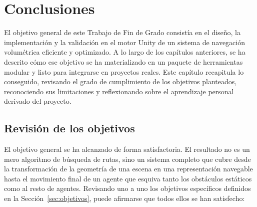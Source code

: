 \chapter{Conclusiones}
\label{chap:conclusiones}

El objetivo general de este Trabajo de Fin de Grado consistía en el diseño, la implementación y la validación en el motor Unity de un sistema de navegación volumétrica eficiente y optimizado.
A lo largo de los capítulos anteriores, se ha descrito cómo ese objetivo se ha materializado en un paquete de herramientas modular y listo para integrarse en proyectos reales.
Este capítulo recapitula lo conseguido, revisando el grado de cumplimiento de los objetivos planteados, reconociendo sus limitaciones y reflexionando sobre el aprendizaje personal derivado del proyecto.

\section{Revisión de los objetivos}

El objetivo general se ha alcanzado de forma satisfactoria.
El resultado no es un mero algoritmo de búsqueda de rutas, sino un sistema completo que cubre desde la transformación de la geometría de una escena en una representación navegable hasta el movimiento final de un agente que esquiva tanto los obstáculos estáticos como al resto de agentes.
Revisando uno a uno los objetivos específicos definidos en la Sección~\ref{sec:objetivos}, puede afirmarse que todos ellos se han satisfecho:

